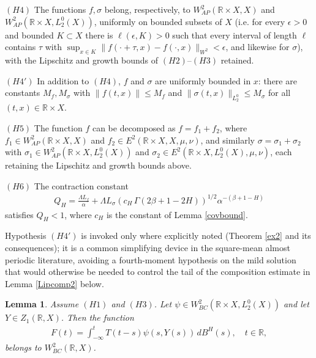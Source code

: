 \documentclass[11pt]{amsart}
\newtheorem{lemma}[theorem]{Lemma}
\begin{document}
$(H4)$ The functions $f,\sigma$ belong, respectively, to $W^2_{AP}(\mathbb R\times X,X)$ and $W^2_{AP}(\mathbb R\times X,L^0_2(X))$, uniformly on bounded subsets of $X$ (i.e. for every $\epsilon>0$ and bounded $K\subset X$ there is $\ell(\epsilon,K)>0$ such that every interval of length $\ell$ contains $\tau$ with $\sup_{x\in K}\|f(\cdot+\tau,x)-f(\cdot,x)\|_{W^2}<\epsilon$, and likewise for $\sigma$), with the Lipschitz and growth bounds of $(H2)$--$(H3)$ retained.

$(H4')$ In addition to $(H4)$, $f$ and $\sigma$ are uniformly bounded in $x$: there are constants $M_f,M_\sigma$ with $\|f(t,x)\|\le M_f$ and $\|\sigma(t,x)\|_{L^0_2}\le M_\sigma$ for all $(t,x)\in\mathbb R\times X$.

$(H5)$ The function $f$ can be decomposed as $f=f_1+f_2$, where $f_1\in W^2_{AP}(\mathbb R\times X,X)$ and $f_2\in E^2(\mathbb R\times X,X,\mu,\nu)$, and similarly $\sigma=\sigma_1+\sigma_2$ with $\sigma_1\in W^2_{AP}(\mathbb R\times X,L^0_2(X))$ and $\sigma_2\in E^2(\mathbb R\times X,L^0_2(X),\mu,\nu)$, each retaining the Lipschitz and growth bounds above.

$(H6)$ The contraction constant
\begin{align*}
Q_H=\frac{\Lambda L_f}{\alpha}+\Lambda L_\sigma\left(c_H\,\Gamma(2\beta+1-2H)\right)^{1/2}\alpha^{-(\beta+1-H)}
\end{align*}
satisfies $Q_H<1$, where $c_H$ is the constant of Lemma \ref{covbound}.

Hypothesis $(H4')$ is invoked only where explicitly noted (Theorem \ref{ex2} and its consequences); it is a common simplifying device in the square-mean almost periodic literature, avoiding a fourth-moment hypothesis on the mild solution that would otherwise be needed to control the tail of the composition estimate in Lemma \ref{Lipcomp2} below.

\begin{lemma}\label{diffbound}
Assume $(H1)$ and $(H3)$. Let $\psi\in W^2_{BC}(\mathbb R\times X,L^0_2(X))$ and let $Y\in Z_1(\mathbb R,X)$. Then the function
\begin{align*}
F(t)=\int_{-\infty}^t T(t-s)\psi(s,Y(s))\,dB^H(s),\quad t\in {\mathbb R},
\end{align*}
belongs to $W^2_{BC}(\mathbb R,X)$.
\end{lemma}
\end{document}
